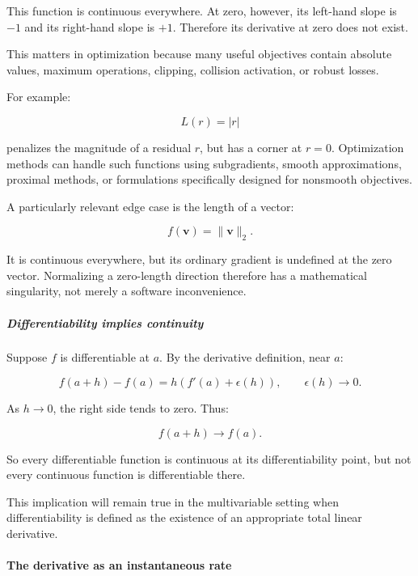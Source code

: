 This function is continuous everywhere. At zero, however, its left-hand slope is \(-1\) and its right-hand slope is \(+1\). Therefore its derivative at zero does not exist.

This matters in optimization because many useful objectives contain absolute values, maximum operations, clipping, collision activation, or robust losses.

For example:

\[
L(r)=|r|
\]

penalizes the magnitude of a residual \(r\), but has a corner at \(r=0\). Optimization methods can handle such functions using subgradients, smooth approximations, proximal methods, or formulations specifically designed for nonsmooth objectives.

A particularly relevant edge case is the length of a vector:

\[
f(\mathbf v)=\|\mathbf v\|_2.
\]

It is continuous everywhere, but its ordinary gradient is undefined at the zero vector. Normalizing a zero-length direction therefore has a mathematical singularity, not merely a software inconvenience.

\subparagraph{Differentiability implies continuity}\label{01-foundations-i-ch020-differentiability-implies-continuity}

\hypertarget{01-foundations-i-ch020-differentiability-implies-continuity}{}

Suppose \(f\) is differentiable at \(a\). By the derivative definition, near \(a\):

\[
f(a+h)-f(a) = h\left(f'(a)+\epsilon(h)\right), \qquad \epsilon(h)\to0.
\]

As \(h\to0\), the right side tends to zero. Thus:

\[
f(a+h)\to f(a).
\]

So every differentiable function is continuous at its differentiability point, but not every continuous function is differentiable there.

This implication will remain true in the multivariable setting when differentiability is defined as the existence of an appropriate total linear derivative.

\paragraph{The derivative as an instantaneous rate}\label{01-foundations-i-ch020-the-derivative-as-an-instantaneous-rate}


